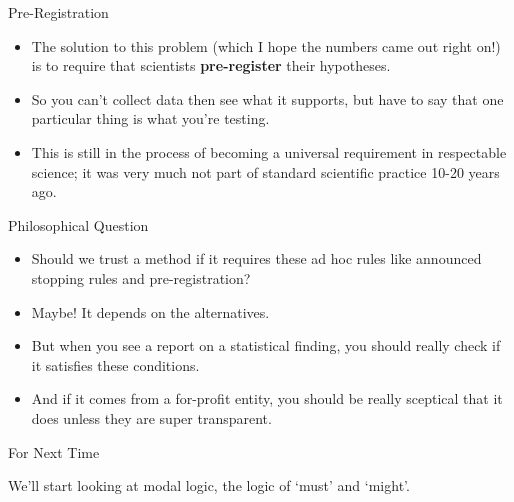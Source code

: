 \documentclass[
  ignorenonframetext,
]{beamer}
\providecommand{\tightlist}{%
  \setlength{\itemsep}{0pt}\setlength{\parskip}{0pt}}
\renewcommand{\,}{\text{, }}
\begin{document}
\begin{frame}{Pre-Registration}
\protect\hypertarget{pre-registration}{}

\begin{itemize}
\tightlist
\item
  The solution to this problem (which I hope the numbers came out right
  on!) is to require that scientists \textbf{pre-register} their
  hypotheses.
\item
  So you can't collect data then see what it supports, but have to say
  that one particular thing is what you're testing.
\item
  This is still in the process of becoming a universal requirement in
  respectable science; it was very much not part of standard scientific
  practice 10-20 years ago.
\end{itemize}

\end{frame}

\begin{frame}{Philosophical Question}
\protect\hypertarget{philosophical-question}{}

\begin{itemize}
\tightlist
\item
  Should we trust a method if it requires these ad hoc rules like
  announced stopping rules and pre-registration? \pause
\item
  Maybe! It depends on the alternatives.
\item
  But when you see a report on a statistical finding, you should really
  check if it satisfies these conditions.
\item
  And if it comes from a for-profit entity, you should be really
  sceptical that it does unless they are super transparent.
\end{itemize}

\end{frame}

\begin{frame}{For Next Time}
\protect\hypertarget{for-next-time}{}

We'll start looking at modal logic, the logic of `must' and `might'.

\end{frame}
\end{document}
